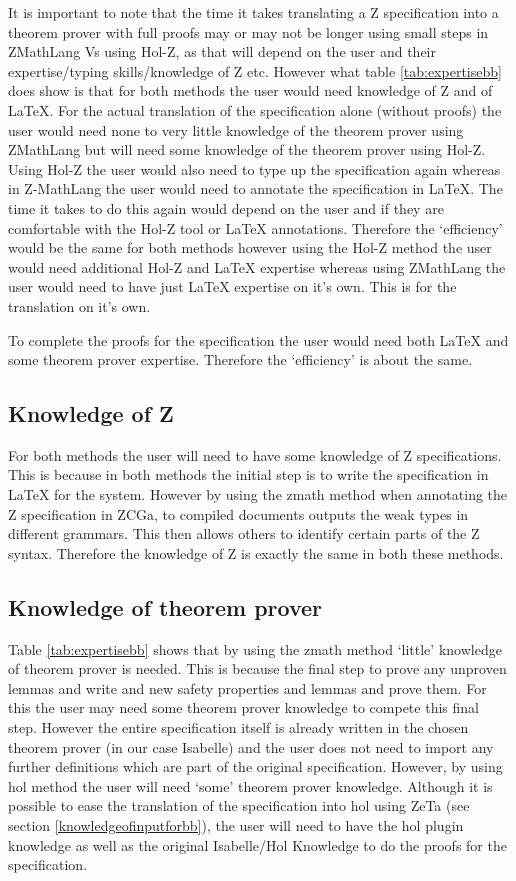 It is important to note that the time it takes translating a Z specification into 
a theorem prover with full proofs may or may not be longer using small steps in ZMathLang Vs
using Hol-Z, as that will depend on the user and their expertise/typing skills/knowledge of Z etc.
However what table \ref{tab:expertisebb} does show is that for both methods the user would
need knowledge of Z and of \LaTeX{}. For the actual translation of the specification alone (without proofs) 
the user would need none to very little knowledge of the theorem prover using ZMathLang but will need some 
knowledge of the theorem prover using Hol-Z.
Using Hol-Z the user would also need to type up the specification again whereas in Z-MathLang the user
would need to annotate the specification in \LaTeX{}. The time it takes to do this again would
depend on the user and if they are comfortable with the Hol-Z tool or \LaTeX{} annotations.
Therefore the `efficiency' would be the same for both methods however using the Hol-Z method the user
would need additional Hol-Z and \LaTeX{} expertise whereas using ZMathLang the user would need to have just \LaTeX{} 
expertise on it's own. This is for the translation on it's own.

To complete the proofs for the specification the user would need both \LaTeX{} and some theorem
prover expertise. Therefore the `efficiency' is about the same.

\subsection{Knowledge of Z}

For both methods the user will need to have some knowledge of Z specifications.
This is because in both methods the initial step is to write the specification
in \LaTeX{} for the system. However by using the \gls{zmath} method when
annotating the Z specification in ZCGa, to compiled documents outputs the weak
types in different grammars. This then allows others to identify certain parts
of the Z syntax. Therefore the knowledge of Z is exactly the same in both these
methods.

\subsection{Knowledge of theorem prover}

Table \ref{tab:expertisebb} shows that by using the \gls{zmath} method `little'
knowledge of theorem prover is needed. This is because the final step to prove
any unproven lemmas and write and new safety properties and lemmas and prove
them. For this the user may need some theorem prover knowledge to compete this
final step. However the entire specification itself is already written in the
chosen theorem prover (in our case Isabelle) and the user does not need to
import any further definitions which are part of the original specification.
However, by using \gls{hol} method the user will need `some' theorem prover
knowledge. Although it is possible to ease the translation of the specification
into \gls{hol} using ZeTa (see section \ref{knowledgeofinputforbb}), the user
will need to have the \gls{hol} plugin knowledge as well as the original
Isabelle/Hol Knowledge to do the proofs for the specification.

